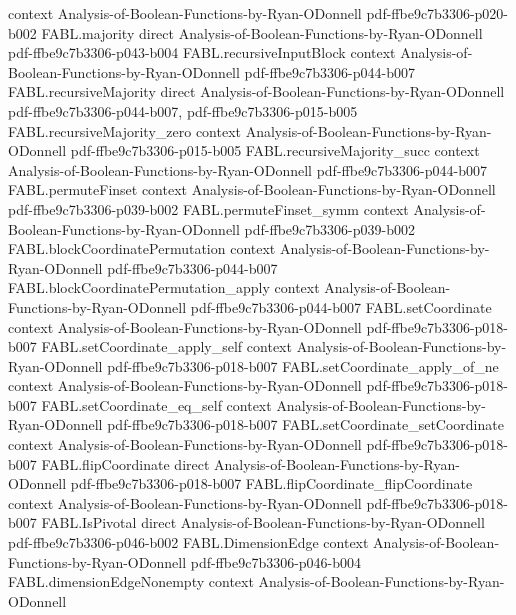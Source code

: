 \begin{theorem}
  {context}
  {Analysis-of-Boolean-Functions-by-Ryan-ODonnell}
  {pdf-ffbe9c7b3306-p020-b002}
\proofstep
  {FABL.majority}
  {direct}
  {Analysis-of-Boolean-Functions-by-Ryan-ODonnell}
  {pdf-ffbe9c7b3306-p043-b004}
\proofstep
  {FABL.recursiveInputBlock}
  {context}
  {Analysis-of-Boolean-Functions-by-Ryan-ODonnell}
  {pdf-ffbe9c7b3306-p044-b007}
\proofstep
  {FABL.recursiveMajority}
  {direct}
  {Analysis-of-Boolean-Functions-by-Ryan-ODonnell}
  {pdf-ffbe9c7b3306-p044-b007,
    pdf-ffbe9c7b3306-p015-b005}
\proofstep
  {FABL.recursiveMajority_zero}
  {context}
  {Analysis-of-Boolean-Functions-by-Ryan-ODonnell}
  {pdf-ffbe9c7b3306-p015-b005}
\proofstep
  {FABL.recursiveMajority_succ}
  {context}
  {Analysis-of-Boolean-Functions-by-Ryan-ODonnell}
  {pdf-ffbe9c7b3306-p044-b007}
\proofstep
  {FABL.permuteFinset}
  {context}
  {Analysis-of-Boolean-Functions-by-Ryan-ODonnell}
  {pdf-ffbe9c7b3306-p039-b002}
\proofstep
  {FABL.permuteFinset_symm}
  {context}
  {Analysis-of-Boolean-Functions-by-Ryan-ODonnell}
  {pdf-ffbe9c7b3306-p039-b002}
\proofstep
  {FABL.blockCoordinatePermutation}
  {context}
  {Analysis-of-Boolean-Functions-by-Ryan-ODonnell}
  {pdf-ffbe9c7b3306-p044-b007}
\proofstep
  {FABL.blockCoordinatePermutation_apply}
  {context}
  {Analysis-of-Boolean-Functions-by-Ryan-ODonnell}
  {pdf-ffbe9c7b3306-p044-b007}
\proofstep
  {FABL.setCoordinate}
  {context}
  {Analysis-of-Boolean-Functions-by-Ryan-ODonnell}
  {pdf-ffbe9c7b3306-p018-b007}
\proofstep
  {FABL.setCoordinate_apply_self}
  {context}
  {Analysis-of-Boolean-Functions-by-Ryan-ODonnell}
  {pdf-ffbe9c7b3306-p018-b007}
\proofstep
  {FABL.setCoordinate_apply_of_ne}
  {context}
  {Analysis-of-Boolean-Functions-by-Ryan-ODonnell}
  {pdf-ffbe9c7b3306-p018-b007}
\proofstep
  {FABL.setCoordinate_eq_self}
  {context}
  {Analysis-of-Boolean-Functions-by-Ryan-ODonnell}
  {pdf-ffbe9c7b3306-p018-b007}
\proofstep
  {FABL.setCoordinate_setCoordinate}
  {context}
  {Analysis-of-Boolean-Functions-by-Ryan-ODonnell}
  {pdf-ffbe9c7b3306-p018-b007}
\proofstep
  {FABL.flipCoordinate}
  {direct}
  {Analysis-of-Boolean-Functions-by-Ryan-ODonnell}
  {pdf-ffbe9c7b3306-p018-b007}
\proofstep
  {FABL.flipCoordinate_flipCoordinate}
  {context}
  {Analysis-of-Boolean-Functions-by-Ryan-ODonnell}
  {pdf-ffbe9c7b3306-p018-b007}
\proofstep
  {FABL.IsPivotal}
  {direct}
  {Analysis-of-Boolean-Functions-by-Ryan-ODonnell}
  {pdf-ffbe9c7b3306-p046-b002}
\proofstep
  {FABL.DimensionEdge}
  {context}
  {Analysis-of-Boolean-Functions-by-Ryan-ODonnell}
  {pdf-ffbe9c7b3306-p046-b004}
\proofstep
  {FABL.dimensionEdgeNonempty}
  {context}
  {Analysis-of-Boolean-Functions-by-Ryan-ODonnell}

\end{theorem}
